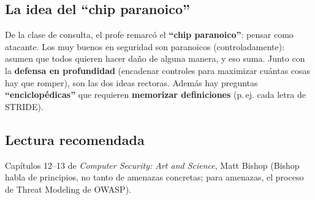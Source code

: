 \documentclass[../main.tex]{subfiles}
\begin{document}
\subsection{La idea del ``chip paranoico''}

\begin{destacado}
De la clase de consulta, el profe remarcó el \textbf{``chip paranoico''}: pensar como atacante.  Los muy buenos en seguridad son paranoicos (controladamente): asumen que todos quieren hacer daño de alguna manera, y eso suma. Junto con la \textbf{defensa en profundidad} (encadenar controles para maximizar cuántas cosas hay que romper), son las dos ideas rectoras. Además hay preguntas \textbf{``enciclopédicas''} que requieren \textbf{memorizar definiciones} (p.\,ej. cada letra de STRIDE).
\end{destacado}

\subsection{Lectura recomendada}
Capítulos 12--13 de \emph{Computer Security: Art and Science}, Matt Bishop (Bishop habla de principios, no tanto de amenazas concretas; para amenazas, el proceso de Threat Modeling de OWASP).
\end{document}
